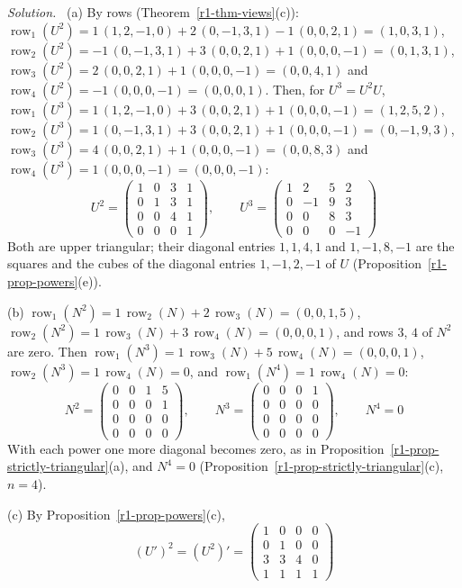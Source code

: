\documentclass[12pt]{article}
\DeclareMathOperator{\row}{row}
\theoremstyle{definition}
\newenvironment{solution}{\par\noindent\textit{Solution.}\ }{\par\smallskip}
\begin{document}
\begin{solution}
(a) By rows (Theorem~\ref{r1-thm-views}(c)): \(\row_1(U^2)=1\,(1,2,-1,0)+2\,(0,-1,3,1)-1\,(0,0,2,1)=(1,0,3,1)\),
\(\row_2(U^2)=-1\,(0,-1,3,1)+3\,(0,0,2,1)+1\,(0,0,0,-1)=(0,1,3,1)\),
\(\row_3(U^2)=2\,(0,0,2,1)+1\,(0,0,0,-1)=(0,0,4,1)\) and \(\row_4(U^2)=-1\,(0,0,0,-1)=(0,0,0,1)\). Then, for
\(U^3=U^2U\), \(\row_1(U^3)=1\,(1,2,-1,0)+3\,(0,0,2,1)+1\,(0,0,0,-1)=(1,2,5,2)\),
\(\row_2(U^3)=1\,(0,-1,3,1)+3\,(0,0,2,1)+1\,(0,0,0,-1)=(0,-1,9,3)\),
\(\row_3(U^3)=4\,(0,0,2,1)+1\,(0,0,0,-1)=(0,0,8,3)\) and \(\row_4(U^3)=1\,(0,0,0,-1)=(0,0,0,-1)\):
\[
U^2=\begin{pmatrix}1&0&3&1\\0&1&3&1\\0&0&4&1\\0&0&0&1\end{pmatrix},\qquad
U^3=\begin{pmatrix}1&2&5&2\\0&-1&9&3\\0&0&8&3\\0&0&0&-1\end{pmatrix}
\]
Both are upper triangular; their diagonal entries \(1,1,4,1\) and \(1,-1,8,-1\) are the squares and the cubes of the
diagonal entries \(1,-1,2,-1\) of \(U\) (Proposition~\ref{r1-prop-powers}(e)).

(b) \(\row_1(N^2)=1\,\row_2(N)+2\,\row_3(N)=(0,0,1,5)\), \(\row_2(N^2)=1\,\row_3(N)+3\,\row_4(N)=(0,0,0,1)\), and
rows \(3\), \(4\) of \(N^2\) are zero. Then \(\row_1(N^3)=1\,\row_3(N)+5\,\row_4(N)=(0,0,0,1)\),
\(\row_2(N^3)=1\,\row_4(N)=0\), and \(\row_1(N^4)=1\,\row_4(N)=0\):
\[
N^2=\begin{pmatrix}0&0&1&5\\0&0&0&1\\0&0&0&0\\0&0&0&0\end{pmatrix},\qquad
N^3=\begin{pmatrix}0&0&0&1\\0&0&0&0\\0&0&0&0\\0&0&0&0\end{pmatrix},\qquad N^4=0
\]
With each power one more diagonal becomes zero, as in Proposition~\ref{r1-prop-strictly-triangular}(a), and
\(N^4=0\) (Proposition~\ref{r1-prop-strictly-triangular}(c), \(n=4\)).

(c) By Proposition~\ref{r1-prop-powers}(c),
\[
(U')^2=(U^2)'=\begin{pmatrix}1&0&0&0\\0&1&0&0\\3&3&4&0\\1&1&1&1\end{pmatrix}
\]
\end{solution}
\end{document}
